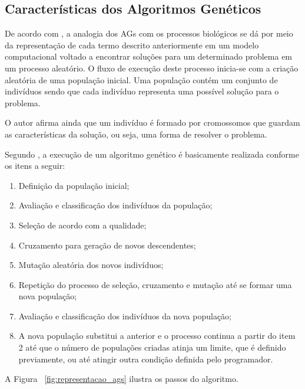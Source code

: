 \subsection{Características dos Algoritmos Genéticos}

\par De acordo com , a analogia dos AGs com
os processos biológicos se dá por meio da representação de cada termo descrito
anteriormente em um modelo computacional voltado a encontrar soluções para um
determinado problema em um processo aleatório. O fluxo de execução deste processo
inicia-se com a criação aleatória de uma população inicial. Uma população contém
um conjunto de indivíduos sendo que cada indivíduo  representa uma possível solução
para o problema.

\par O autor afirma ainda que um indivíduo é formado por cromossomos que
guardam as características da solução, ou seja, uma forma de resolver o
problema.

\par Segundo , a execução de um 
algoritmo genético é basicamente realizada conforme os itens a seguir:

\begin{enumerate}
	\item Definição da população inicial;
	\item Avaliação e classificação dos indivíduos da população;
	\item Seleção de acordo com a qualidade;
	\item Cruzamento para geração de novos descendentes;
	\item Mutação aleatória dos novos indivíduos;
	\item Repetição do processo de seleção, cruzamento e mutação até se formar uma nova população;
	\item Avaliação e classificação dos indivíduos da nova população;
	\item A nova população substitui a anterior e o processo continua a partir do
	item 2 até que o número de populações criadas atinja um limite, que é definido
	previamente, ou até atingir outra condição definida pelo programador.
\end{enumerate}

\par A Figura ~\ref{fig:representacao_ags} ilustra os passos do algoritmo.


